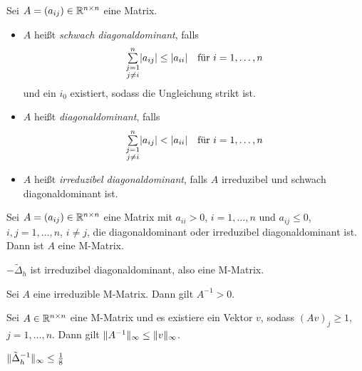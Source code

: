 \documentclass{cheat-sheet}
\newcommand{\Laplace}{\Delta}
\begin{document}
\begin{defn}
  Sei $A = (a_{ij}) \in \mathbb{R}^{n \times n}$ eine Matrix.
  \begin{itemize}
    \item $A$ heißt \emph{schwach diagonaldominant}, falls
    \[
      \sum_{\substack{j=1\\j \neq i}}^n \abs{a_{ij}} \leq \abs{a_{ii}} \quad
      \text{für $i = 1, \ldots, n$}
    \]
    und ein $i_0$ existiert, sodass die Ungleichung strikt ist.
    \item $A$ heißt \emph{diagonaldominant}, falls
    \[
      \sum_{\substack{j=1\\j \neq i}}^n \abs{a_{ij}} < \abs{a_{ii}} \quad
      \text{für $i = 1, \ldots, n$}
    \]
    \item $A$ heißt \emph{irreduzibel diagonaldominant}, falls $A$ irreduzibel und schwach diagonaldominant ist.
  \end{itemize}
\end{defn}

\begin{lem}
  Sei $A = (a_{ij}) \in \mathbb{R}^{n \times n}$ eine Matrix mit $a_{ii} > 0$, $i = 1, \ldots, n$ und $a_{ij} \leq 0$, $i, j = 1, \ldots, n$, $i \neq j$, die diagonaldominant oder irreduzibel diagonaldominant ist.
  Dann ist $A$ eine M-Matrix.
\end{lem}

\begin{bem}
  $- \tilde{\Laplace}_h$ ist irreduzibel diagonaldominant, also eine M-Matrix.
\end{bem}

\begin{lem}
  Sei $A$ eine irreduzible M-Matrix. Dann gilt $A^{-1} > 0$.
\end{lem}


\begin{lem}
  Sei $A \in \mathbb{R}^{n \times n}$ eine M-Matrix und es existiere ein Vektor $v$, sodass $(Av)_j \geq 1$, $j = 1, \ldots, n$.
  Dann gilt $\lVert A^{-1}\rVert_\infty \leq \lVert v\rVert_\infty$.
\end{lem}

\begin{lem}
  $\norm{\tilde{\Laplace}_h^{-1}}_\infty \leq \tfrac{1}{8}$
\end{lem}
\end{document}

